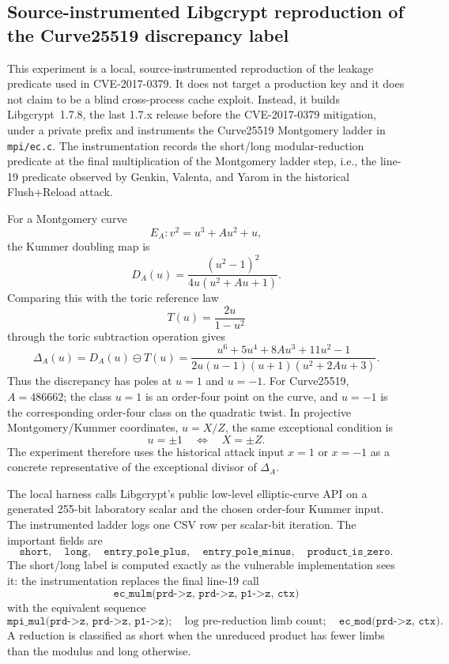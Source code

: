 \subsection{Source-instrumented Libgcrypt reproduction of the Curve25519 discrepancy label}
\label{subsec:libgcrypt-cve-2017-0379-source-instrumented}

This experiment is a local, source-instrumented reproduction of the leakage
predicate used in CVE-2017-0379.  It does not target a production key and it
does not claim to be a blind cross-process cache exploit.  Instead, it builds
Libgcrypt~1.7.8, the last 1.7.x release before the CVE-2017-0379 mitigation,
under a private prefix and instruments the Curve25519 Montgomery ladder in
\texttt{mpi/ec.c}.  The instrumentation records the short/long modular-reduction
predicate at the final multiplication of the Montgomery ladder step, i.e., the
line-19 predicate observed by Genkin, Valenta, and Yarom in the historical
Flush+Reload attack.

For a Montgomery curve
\[
  E_A : v^2=u^3+Au^2+u,
\]
the Kummer doubling map is
\[
  D_A(u)=\frac{(u^2-1)^2}{4u(u^2+Au+1)} .
\]
Comparing this with the toric reference law
\[
  T(u)=\frac{2u}{1-u^2}
\]
through the toric subtraction operation gives
\[
  \Delta_A(u)=D_A(u)\ominus T(u)
  =\frac{u^6+5u^4+8Au^3+11u^2-1}
        {2u(u-1)(u+1)(u^2+2Au+3)} .
\]
Thus the discrepancy has poles at \(u=1\) and \(u=-1\).  For Curve25519,
\(A=486662\); the class \(u=1\) is an order-four point on the curve, and
\(u=-1\) is the corresponding order-four class on the quadratic twist.  In
projective Montgomery/Kummer coordinates, \(u=X/Z\), the same exceptional
condition is
\[
  u=\pm1 \quad\Longleftrightarrow\quad X=\pm Z .
\]
The experiment therefore uses the historical attack input \(x=1\) or \(x=-1\)
as a concrete representative of the exceptional divisor of \(\Delta_A\).

The local harness calls Libgcrypt's public low-level elliptic-curve API on a
generated 255-bit laboratory scalar and the chosen order-four Kummer input.  The
instrumented ladder logs one CSV row per scalar-bit iteration.  The important
fields are
\[
  \texttt{short},\quad \texttt{long},\quad
  \texttt{entry\_pole\_plus},\quad \texttt{entry\_pole\_minus},\quad
  \texttt{product\_is\_zero} .
\]
The short/long label is computed exactly as the vulnerable implementation sees
it: the instrumentation replaces the final line-19 call
\[
  \texttt{ec\_mulm(prd->z, prd->z, p1->z, ctx)}
\]
with the equivalent sequence
\[
  \texttt{mpi\_mul(prd->z, prd->z, p1->z)};
  \quad \text{log pre-reduction limb count};
  \quad \texttt{ec\_mod(prd->z, ctx)} .
\]
A reduction is classified as short when the unreduced product has fewer limbs
than the modulus and long otherwise.

